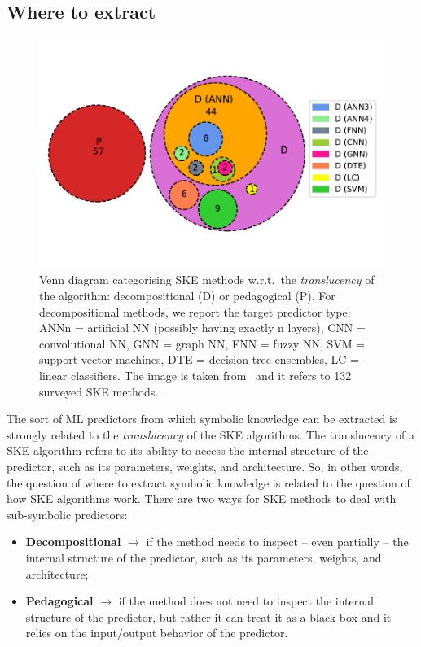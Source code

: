 \subsection{Where to extract}\label{subsec:where-to-extract}
%
\begin{figure}
    \centering
    \includegraphics[width=.6\linewidth]{figures/ske-translucency}
    \caption[Venn diagram categorising SKE methods]{
        Venn diagram categorising \gls{SKE} methods w.r.t.\ the \emph{translucency} of the algorithm: decompositional (D) or pedagogical (P).
        For decompositional methods, we report the target predictor type: ANN\<n\> = artificial \gls{NN} (possibly having exactly \<n\> layers), CNN = convolutional \gls{NN}, GNN = graph \gls{NN}, FNN = fuzzy \gls{NN}, SVM = support vector machines, DTE = decision tree ensembles, LC = linear classifiers.
        The image is taken from~\cite{DBLP:journals/csur/CiattoSAMO24} and it refers to 132 surveyed \gls{SKE} methods.
    }
    \label{fig:pie-ske-translucency}
\end{figure}
%
The sort of \gls{ML} predictors from which symbolic knowledge can be extracted is strongly related to the \emph{translucency} of the \gls{SKE} algorithms.
%
The translucency of a \gls{SKE} algorithm refers to its ability to access the internal structure of the predictor, such as its parameters, weights, and architecture.
%
So, in other words, the question of where to extract symbolic knowledge is related to the question of how \gls{SKE} algorithms work.
%
There are two ways for \gls{SKE} methods to deal with sub-symbolic predictors:
%
\begin{itemize}
    \item \textbf{Decompositional} $\rightarrow$ if the method needs to inspect -- even partially -- the internal structure of the predictor, such as its parameters, weights, and architecture;
    \item \textbf{Pedagogical} $\rightarrow$ if the method does not need to inspect the internal structure of the predictor, but rather it can treat it as a black box and it relies on the input/output behavior of the predictor.
\end{itemize}

